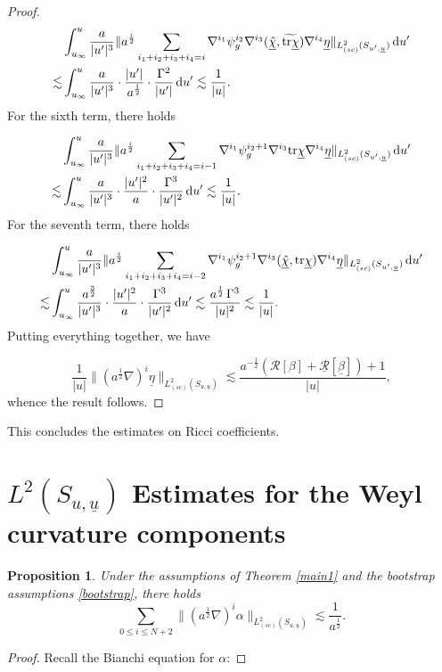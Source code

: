 \documentclass{amsart}
\newtheorem{proposition}{Proposition}[section]
\newcommand{\aln}{(\al \nabla)^i}
\newcommand{\hsp}{\hspace{.5mm}}
\newcommand{\intu}{\int_{u_{\infty}}^u}
\newcommand{\upr}{\lvert u^\prime \rvert}
\newcommand{\al}{a^{\frac{1}{2}}}
\newcommand{\chibar}{\underline{\chi}}
\newcommand{\chibarhat}{\underline{\hat{\chi}}}
\newcommand{\ubar}{\underline{u}}
\newcommand{\sumif}{\sum_{i_1+i_2+i_3+i_4=i}}
\newcommand{\sumifi}{\sum_{i_1+i_2+i_3+i_4=i-1}}
\newcommand{\sumifim}{\sum_{i_1+i_2+i_3+i_4=i-2}}
\newcommand{\tildetr}{\widetilde{\tr \chibar}}
\newcommand{\nablap}{\nabla^{i_1}\psi_g^{i_2}}
\newcommand{\nablapp}{\nabla^{i_1}\psi_g^{i_2+1}}
\newcommand{\scaletwoSu}[1]{\lVert{#1} \rVert_{L^2_{(sc)}(S_{u,\ubar})}}
\newcommand{\scaletwoSuprime}[1]{\lVert{#1} \rVert_{L^2_{(sc)}(S_{u^\prime,\ubar})}}
\newcommand{\betabar}{\underline{\beta}}
\newcommand{\etabar}{\underline{\eta}}
\newcommand{\duprime}{\hspace{.5mm} \text{d}u^{\prime}}
\newcommand{\nablat}{\nabla^{i_3}}
\newcommand{\nablaf}{\nabla^{i_4}}
\newcommand{\tr}{\mbox{tr}}
\begin{document}
{\begin{proof}
    
      \begin{align}
        \nonumber  &\intu \frac{a}{\upr^3}\scaletwoSuprime{a^{\frac{i}{2}} \sumif \nablap \nablat (\chibarhat,\tildetr) \nablaf \etabar} \duprime \\ \lesssim& \intu\frac{a}{\upr^3} \cdot \frac{\upr}{\al}\cdot \frac{\Gamma^2}{\upr} \duprime \lesssim \frac{1}{\lvert u \rvert}.
    \end{align}For the sixth term, there holds
    
        \begin{align}
      \nonumber   &\intu \frac{a}{\upr^3}\scaletwoSuprime{a^{\frac{i}{2}} \sumifi \nablapp \nablat \tr\chibar \nablaf \etabar} \duprime  \\ \lesssim &\intu \frac{a}{\upr^3}\cdot \frac{\upr^2}{a}\cdot\frac{\Gamma^3}{\upr^2}\duprime \lesssim \frac{1}{\lvert u\rvert}.
    \end{align}For the seventh term, there holds
    
        \begin{align}
      \nonumber   &\intu \frac{a}{\upr^3}\scaletwoSuprime{a^{\frac{i}{2}} \sumifim \nablapp \nablat (\chibarhat, \tr\chibar) \nablaf \etabar} \duprime  \\ \lesssim &\intu \frac{a^{\frac{3}{2}}}{\upr^3}\cdot \frac{\upr^2}{a}\cdot\frac{\Gamma^3}{\upr^2}\duprime \lesssim \frac{\al \hsp \Gamma^3}{\lvert u \rvert^2} \lesssim \frac{1}{\lvert u\rvert}.
    \end{align}
    Putting everything together, we have
    
    \[ \frac{1}{\lvert u \rvert} \scaletwoSu{\aln\etabar}\lesssim \frac{a^{-\frac{1}{2}}(\mathcal{R}[\beta]+\underline{\mathcal{R}}[\betabar])+1}{\lvert u \rvert}, \]whence the result follows.
    
    
    \end{proof}
    \noindent This concludes the estimates on Ricci coefficients.

\section{$L^{2}(S_{u,\ubar})$ Estimates for the Weyl curvature components}
\begin{proposition}
Under the assumptions of Theorem \ref{main1} and the bootstrap assumptions \eqref{bootstrap}, there holds 
\[ \sum_{0\leq i \leq N+2} \scaletwoSu{\aln \alpha} \lesssim \frac{1}{a^{\frac{1}{2}}}. \]
\end{proposition}
\begin{proof}
    Recall the Bianchi equation for $\alpha$:
    

\end{proof}}
\end{document}

